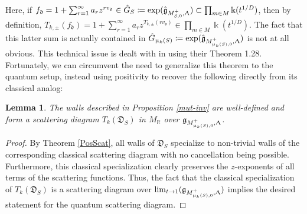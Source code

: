 \documentclass{amsart}
\let\bb=\mathbb
\let\rar=\rightarrow
\let\f=\mathfrak
\newcommand {\kk} {\Bbbk}
\renewcommand{\Lambda}{\Uplambda}
\renewcommand{\mu}{\upmu}
\theoremstyle{plain}%
\newtheorem{lem}[thm]{Lemma}
\theoremstyle{definition}
\theoremstyle{remark}
\begin{document}
Here, if $f_{\f{d}}=1+\sum_{r=1}^{\infty} a_rz^{rv_{\f{d}}}\in \hat{G}_S\coloneqq \exp (\hat{\f{g}}_{M_{S,0}^+,\Lambda})\subset \prod_{m\in M} \kk(t^{1/D})$, then by definition, $T_{k,\pm}(f_{\f{d}})=1+\sum_{r=1}^{\infty} a_rz^{T_{k,\pm}(rv_{\f{d}})}\in \prod_{m\in M} \kk(t^{1/D})$.  The fact that this latter sum is actually contained in $\hat{G}_{\mu_k(S)}\coloneqq \exp (\hat{\f{g}}_{M_{\mu_k(S),0}^+,\Lambda})$ is not at all obvious.  This technical issue is dealt with in \cite{GHKK} using their Theorem 1.28.  Fortunately, we can circumvent the need to generalize this theorem to the quantum setup, instead using positivity to recover the following directly from its classical analog:
\begin{lem}\label{Tkscat}
The walls described in Proposition \ref{mut-inv} are well-defined and form a scattering diagram $T_k(\f{D}_S)$ in $M_{\bb{R}}$ over $\f{g}_{M_{\mu_k(S),0}^+,\Lambda}$.
\end{lem}
\begin{proof}
By Theorem \ref{PosScat}, all walls of $\f{D}_S$ specialize to non-trivial walls of the corresponding classical scattering diagram with no cancellation being possible.  Furthermore, this classical specialization clearly preserves the $z$-exponents of all terms of the scattering functions. Thus, the fact that the classical specialization of $T_k(\f{D}_S)$ is a scattering diagram over $\lim_{t\rar 1} (\f{g}_{M_{\mu_k(S),0}^+,\Lambda})$ \cite[Thm 1.24]{GHKK} implies the desired statement for the quantum scattering diagram.
\end{proof}
\end{document}
